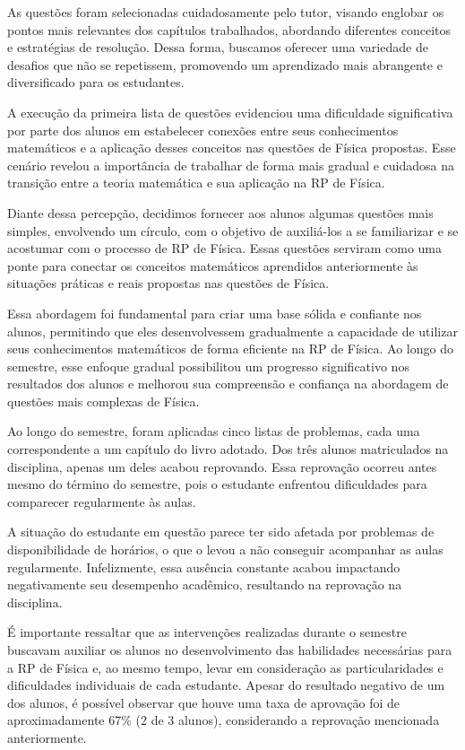 As questões foram selecionadas cuidadosamente pelo tutor, visando englobar os pontos mais relevantes dos capítulos trabalhados, abordando diferentes conceitos e estratégias de resolução. Dessa forma, buscamos oferecer uma variedade de desafios que não se repetissem, promovendo um aprendizado mais abrangente e diversificado para os estudantes.

A execução da primeira lista de questões evidenciou uma dificuldade significativa por parte dos alunos em estabelecer conexões entre seus conhecimentos matemáticos e a aplicação desses conceitos nas questões de Física propostas. Esse cenário revelou a importância de trabalhar de forma mais gradual e cuidadosa na transição entre a teoria matemática e sua aplicação na RP de Física.

Diante dessa percepção, decidimos fornecer aos alunos algumas questões mais simples, envolvendo um círculo, com o objetivo de auxiliá-los a se familiarizar e se acostumar com o processo de RP de Física. Essas questões serviram como uma ponte para conectar os conceitos matemáticos aprendidos anteriormente às situações práticas e reais propostas nas questões de Física.

Essa abordagem foi fundamental para criar uma base sólida e confiante nos alunos, permitindo que eles desenvolvessem gradualmente a capacidade de utilizar seus conhecimentos matemáticos de forma eficiente na RP de Física. Ao longo do semestre, esse enfoque gradual possibilitou um progresso significativo nos resultados dos alunos e melhorou sua compreensão e confiança na abordagem de questões mais complexas de Física.

Ao longo do semestre, foram aplicadas cinco listas de problemas, cada uma correspondente a um capítulo do livro adotado. Dos três alunos matriculados na disciplina, apenas um deles acabou reprovando. Essa reprovação ocorreu antes mesmo do término do semestre, pois o estudante enfrentou dificuldades para comparecer regularmente às aulas.

A situação do estudante em questão parece ter sido afetada por problemas de disponibilidade de horários, o que o levou a não conseguir acompanhar as aulas regularmente. Infelizmente, essa ausência constante acabou impactando negativamente seu desempenho acadêmico, resultando na reprovação na disciplina.

É importante ressaltar que as intervenções realizadas durante o semestre buscavam auxiliar os alunos no desenvolvimento das habilidades necessárias para a RP de Física e, ao mesmo tempo, levar em consideração as particularidades e dificuldades individuais de cada estudante. Apesar do resultado negativo de um dos alunos, é possível observar que houve uma taxa de aprovação foi de aproximadamente 67\% (2 de 3 alunos), considerando a reprovação mencionada anteriormente.

